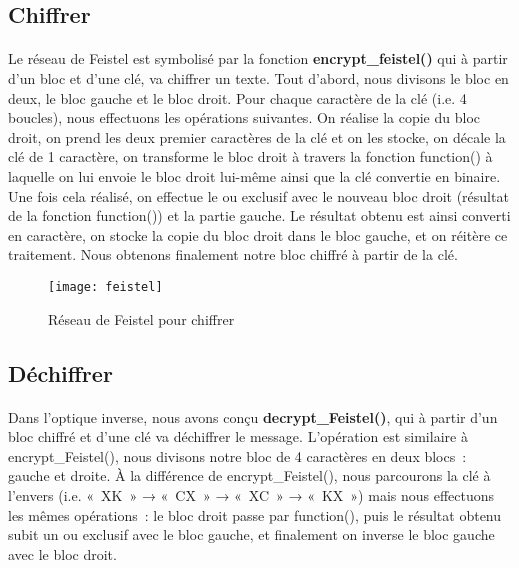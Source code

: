 \documentclass[11pt,fleqn]{book} %
\begin{document}
\subsection{Chiffrer}

\paragraph{}Le réseau de Feistel est symbolisé par la fonction \textbf{encrypt\_feistel()} qui à partir d'un bloc et d'une clé, va chiffrer un texte. Tout d'abord, nous divisons le bloc en deux, le bloc gauche et le bloc droit. Pour chaque caractère de la clé (i.e. 4 boucles), nous effectuons les opérations suivantes. On réalise la copie du bloc droit, on prend les deux premier caractères de la clé et on les stocke, on décale la clé de 1 caractère, on transforme le bloc droit à travers la fonction function() à laquelle on lui envoie le bloc droit lui-même ainsi que la clé convertie en binaire. Une fois cela réalisé, on effectue le ou exclusif avec le nouveau bloc droit (résultat de la fonction function()) et la partie gauche. Le résultat obtenu est ainsi converti en caractère, on stocke la copie du bloc droit dans le bloc gauche, et on réitère ce traitement. Nous obtenons finalement notre bloc chiffré à partir de la clé.
\clearpage
\begin{figure}[!h]
\centering\texttt{[image: feistel]}
\caption{Réseau de Feistel pour chiffrer}
\end{figure}



\subsection{Déchiffrer}

\paragraph{}Dans l'optique inverse, nous avons conçu \textbf{decrypt\_Feistel()}, qui à partir d'un bloc chiffré et d'une clé va déchiffrer le message. L'opération est similaire à encrypt\_Feistel(), nous divisons notre bloc de 4 caractères en deux blocs : gauche et droite. À la différence de encrypt\_Feistel(), nous parcourons la clé à l'envers (i.e. « XK » → « CX » → « XC » → « KX ») mais nous effectuons les mêmes opérations : le bloc droit passe par function(), puis le résultat obtenu subit un ou exclusif avec le bloc gauche, et finalement on inverse le bloc gauche avec le bloc droit.
\end{document}
